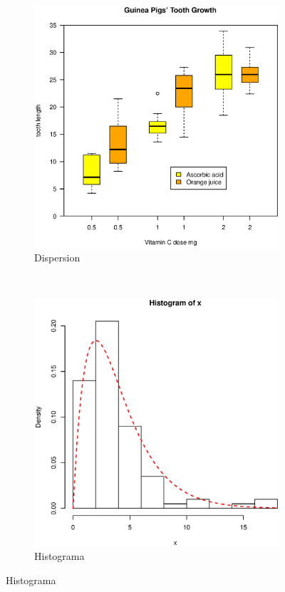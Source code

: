 \documentclass[12pt,a4paper]{article}
\begin{document}
\begin{figure}[h]
\begin{subfigure}[b]{0.3 \textwidth} \includegraphics[width=\textwidth]{boxplot} \caption{Dispersion}
\label{fig:disp}
\end{subfigure}
~
\begin{subfigure}[b]{0.3 \textwidth} \includegraphics[width=\textwidth]{histograma} \caption{Histograma}

\end{subfigure}
\end{figure}
\end{document}
